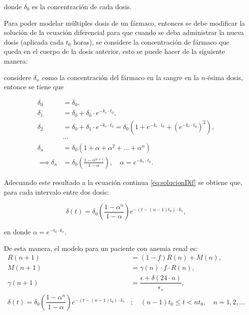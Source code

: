 donde $\delta_0$ es la concentración de cada dosis.

Para poder modelar múltiples dosis de un fármaco, entonces se debe modificar la solución de la ecuación diferencial para que cuando se deba administrar la nueva dosis (aplicada cada $t_0$ horas), se considere la concentración de fármaco que queda en el cuerpo de la dosis anterior, esto se puede hacer de la siguiente manera:

considere $\delta_n$ como la concentración del fármaco en la sangre en la $n$-ésima dosis, entonce se tiene que 

\begin{align*}
    \delta_0 &= \delta_0,\\
    \delta_1 &= \delta_0 + \delta_0\cdot e^{-k_e\cdot t_0}, \\
    \delta_2 &= \delta_0 + \delta_1\cdot e^{-k_e\cdot t_0}= \delta_0\left(1+e^{-k_e\cdot t_0}+\left(e^{-k_e\cdot t_0}\right)^2\right), \\
    &\cdots \\
    \delta_n &= \delta_0(1+\alpha+\alpha^2+...+\alpha^{n}) \\
    \implies \delta_n &= \delta_0\left(\frac{1-\alpha^{n+1}}{1-\alpha}\right),\quad \alpha=e^{-k_e\cdot t_0}.
\end{align*}

Adecuando este resultado a la ecuación continua \ref{eq:solucionDif} se obtiene que, para cada intervalo entre dos dosis:

\begin{equation*}
    \delta(t) = \delta_{0} \left(\dfrac{1-\alpha^{n}}{1 - \alpha}\right) e^{-(t- (n-1) t_{0})\cdot k_e},
\end{equation*}  

en donde $\alpha = e^{-t_0\cdot k_e}$.

De esta manera, el modelo para un paciente con anemia renal es:
\begin{align}
    R(n+1) &=(1-f)R(n)+M(n), \\
    M(n+1) &=\gamma(n) \cdot f\cdot R(n), \nonumber \\
    \gamma(n+1) &=\dfrac{\epsilon + \delta(24\cdot n)}{\epsilon_s}, \nonumber \\
    \delta(t) = \delta_{0} \left(\dfrac{1-\alpha^{n}}{1 - \alpha}\right) e^{-(t- (n-1) t_{0})\cdot k_e} &; \quad (n-1)t_{0} \leq t < n t_{0}, \quad n=1,2,\dots\nonumber
\end{align}

